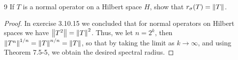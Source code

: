 \begin{exercise}{9}
If $T$ is a normal operator on a Hilbert space $H$, show that $r_\sigma(T) = \left\lVert T\right\rVert$.
\end{exercise}
\begin{proof}
In exercise 3.10.15 we concluded that for normal operators on Hilbert spaces we have $\left\lVert T^2\right\rVert = \left\lVert T\right\rVert^2$.
Thus, we let $n = 2^k$, then $\left\lVert T^n\right\rVert^{1/n} = \left\lVert T\right\rVert^{n/n} = \left\lVert T\right\rVert$, so that by taking the limit as $k \to \infty$, and using Theorem 7.5-5, we obtain the desired spectral radius.
\end{proof} 
